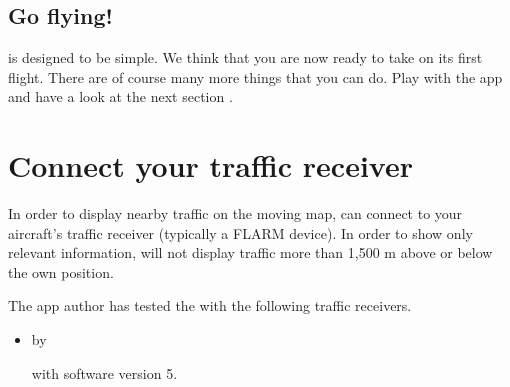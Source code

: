 \documentclass[letterpaper,10pt,english]{sphinxmanual}
\begin{document}
\section{Go flying!}
\label{\detokenize{01-intro/03-firstFlight:go-flying}}
\sphinxAtStartPar
{} is designed to be simple.  We think that you are
now ready to take  on its first flight.  There are
of course many more things that you can do.  Play with the app and have a look
at the next section {\hyperref[\detokenize{index:sec-steps}]{}}.


\chapter{Connect your traffic receiver}
\label{\detokenize{02-steps/traffic:connect-your-traffic-receiver}}\label{\detokenize{02-steps/traffic::doc}}
\sphinxAtStartPar
In order to display nearby traffic on the moving map,  can connect to your aircraft’s traffic receiver (typically a FLARM
device).  In order to show only relevant information,  will not display traffic more than 1,500 m above or below the own
position.

\sphinxAtStartPar
The app author has tested the  with the following
traffic receivers.
\begin{itemize}
\item {} 
\sphinxAtStartPar
{}%
\begin{footnote}[9]\sphinxAtStartFootnote
{}
%
\end{footnote} by %
\begin{footnote}[10]\sphinxAtStartFootnote
{}
%
\end{footnote} with software version 5.

\end{itemize}
\end{document}
